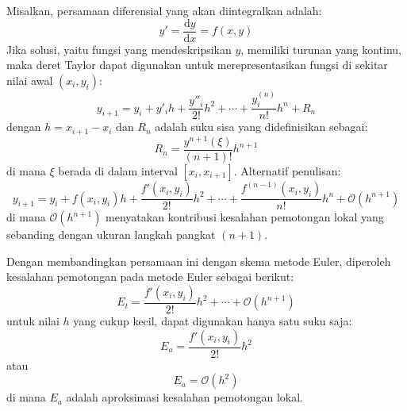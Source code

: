 Misalkan, persamaan diferensial yang akan diintegralkan adalah:
\begin{equation*}
y' = \frac{\mathrm{d}y}{\mathrm{d}x} = f(x,y)
\end{equation*}
Jika solusi, yaitu fungsi yang mendeskripsikan $y$, memiliki turunan yang kontinu, maka
deret Taylor dapat digunakan untuk merepresentasikan fungsi di sekitar nilai awal
$(x_i, y_i)$:
\begin{equation*}
y_{i+1} = y_{i} + y'_{i} h + \frac{y''_{i}}{2!}h^2 + \cdots + \frac{y^{(n)}_{i}}{n!} h^n + R_n
\end{equation*}
dengan $h = x_{i+1} - x_{i}$ dan $R_n$ adalah suku sisa yang didefinisikan sebagai:
\begin{equation*}
R_n = \frac{y^{n+1}(\xi)}{(n+1)!} h^{n+1}
\end{equation*}
di mana $\xi$ berada di dalam interval $[x_i, x_{i+1}]$.
Alternatif penulisan:
\begin{equation*}
y_{i+1} = y_{i} + f(x_i, y_i) h + \frac{f'(x_i, y_i)}{2!}h^2 + \cdots +
\frac{f^{(n-1)}(x_i, y_i)}{n!} h^n + \mathcal{O}(h^{n+1})
\end{equation*}
di mana $\mathcal{O}(h^{n+1})$ menyatakan kontribusi kesalahan pemotongan lokal
yang sebanding dengan ukuran langkah pangkat $(n+1)$.

Dengan membandingkan persamaan ini dengan skema metode Euler, diperoleh
kesalahan pemotongan pada metode Euler sebagai berikut:
\begin{equation*}
E_{t} = \frac{f'(x_i, y_i)}{2!} h^2 + \cdots + \mathcal{O}(h^{n+1})
\end{equation*}
untuk nilai $h$ yang cukup kecil, dapat digunakan hanya satu suku saja:
\begin{equation*}
E_{a} = \frac{f'(x_i, y_i)}{2!} h^2
\end{equation*}
atau
\begin{equation*}
E_a = \mathcal{O}(h^2)
\end{equation*}
di mana $E_a$ adalah aproksimasi kesalahan pemotongan lokal.

